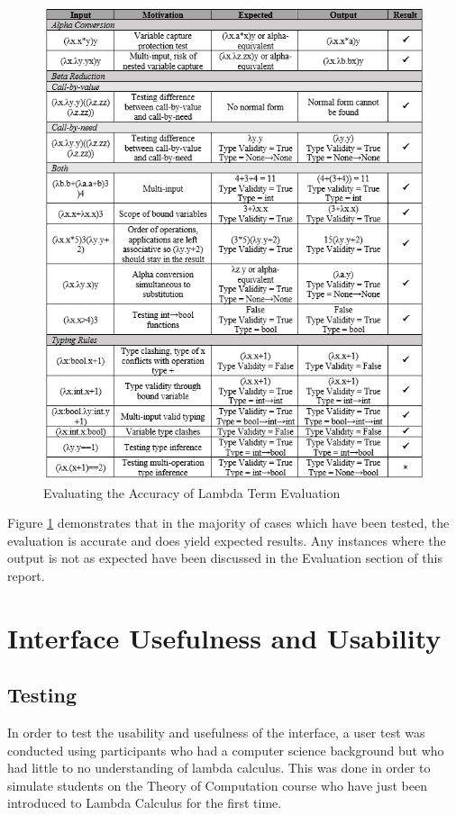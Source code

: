\documentclass[a4paper,11pt]{report}
\begin{document}
\begin{figure}[p]
	\includegraphics[scale=1.3]{images/Testing_Log}
	\centering
	\caption{Evaluating the Accuracy of Lambda Term Evaluation}
	\label{testing_log}
\end{figure}

Figure \ref{testing_log} demonstrates that in the majority of cases which have been tested, the evaluation is accurate and does yield expected results. Any instances where the output is not as expected have been discussed in the Evaluation section of this report.

\section{Interface Usefulness and Usability}
\label{interface usefulness and usability}
\subsection{Testing}

In order to test the usability and usefulness of the interface, a user test was conducted using participants who had a computer science background but who had little to no understanding of lambda calculus. This was done in order to simulate students on the Theory of Computation course who have just been introduced to Lambda Calculus for the first time.\\
\end{document}
